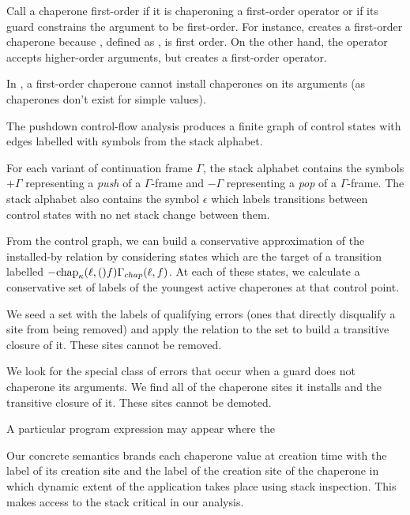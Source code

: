 \documentclass{sigplanconf}
\begin{document}

Call a chaperone first-order if it is chaperoning a first-order operator or if its guard constrains the argument to be first-order.
For instance,  creates a first-order chaperone because , defined as , is first order.
On the other hand, the operator  accepts higher-order arguments, but  creates a first-order operator.

In \chapcalc, a first-order chaperone cannot install chaperones on its arguments (as chaperones don't exist for simple values).

The pushdown control-flow analysis produces a finite graph of control states with edges labelled with symbols from the stack alphabet.

For each variant of continuation frame $\Gamma$, the stack alphabet contains the symbols $+\Gamma$ representing a \emph{push} of a $\Gamma$-frame and $-\Gamma$ representing a \emph{pop} of a $\Gamma$-frame.
The stack alphabet also contains the symbol $\epsilon$ which labels transitions between control states with no net stack change between them.

From the control graph, we can build a conservative approximation of the installed-by relation by considering states which are the target of a transition labelled $-\mathrm{chap}_\kappa(\ell,()f)\Gamma_{chap}(\ell,f)$.
At each of these states, we calculate a conservative set of labels of the youngest active chaperones at that control point.



We seed a set with the labels of qualifying errors (ones that directly disqualify a site from being removed)
and apply the relation to the set to build a transitive closure of it.
These sites cannot be removed.

We look for the special class of errors that occur when a guard does not chaperone its arguments.
We find all of the chaperone sites it installs and the transitive closure of it.
These sites cannot be demoted.

A particular program expression may appear where the 

Our concrete semantics brands each chaperone value at creation time with the label of its creation site and the label of the creation site of the chaperone in which dynamic extent of the application takes place using stack inspection. This makes access to the stack critical in our analysis.
\end{document}
